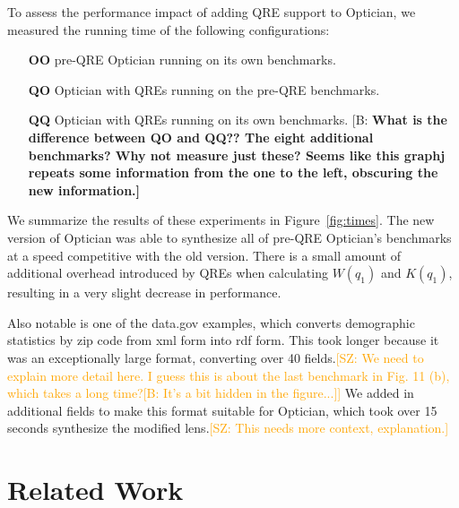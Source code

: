 \documentclass[acmsmall,review,anonymous]{acmart}
\newcommand{\FINISH}[3]{\ifdraft\textcolor{#1}{[#2: #3]}\fi}
\newcommand{\bcp}[1]{\FINISH{dkred}{B}{#1}}
\newcommand{\BCP}[1]{\FINISH{dkred}{B}{\bf #1}}
\newcommand{\saz}[1]{\FINISH{orange}{SZ}{#1}}
\newcommand{\OpticianRuntime}{\textbf{OO}}
\newcommand{\SystemOnOptician}{\textbf{QO}}
\newcommand{\SystemOnBenchmarks}{\textbf{QQ}}
\begin{document}
To assess the performance impact of adding QRE support to Optician, we measured
the running time of the following configurations:
\begin{itemize}
  \item[\OpticianRuntime{}] pre-QRE Optician running on its own benchmarks.
  \item[\SystemOnOptician{}] Optician with QREs running on the pre-QRE benchmarks.
  \item[\SystemOnBenchmarks{}] Optician with QREs running on its own
  benchmarks. \BCP{What is the difference between QO and QQ??  The eight
    additional benchmarks?  Why not measure just these?  Seems like this
    graphj repeats some information from the one to the left, obscuring the
    new information.}
\end{itemize}

We summarize the results of these experiments in Figure~\ref{fig:times}.  The
new version of Optician was able to synthesize all of pre-QRE Optician's
benchmarks at a speed competitive with the old version.  There is a small amount
of additional overhead introduced by QREs when calculating $W(q_1)$ and $K(q_1)$,
resulting in a very slight decrease in performance.

Also notable is one of the data.gov examples, which converts demographic
statistics by zip code from xml form into rdf form. This took longer because it
was an exceptionally large format, converting over 40 fields.\saz{We need to
  explain more detail here.  I guess this is about the last benchmark in Fig. 11
  (b), which takes a long time?\bcp{It's a bit hidden in the figure...}}  We
added in additional fields to make this 
format suitable for Optician, which took over 15 seconds synthesize the modified
lens.\saz{This needs more context, explanation.}

\section{Related Work}
\label{relwork}
\end{document}
